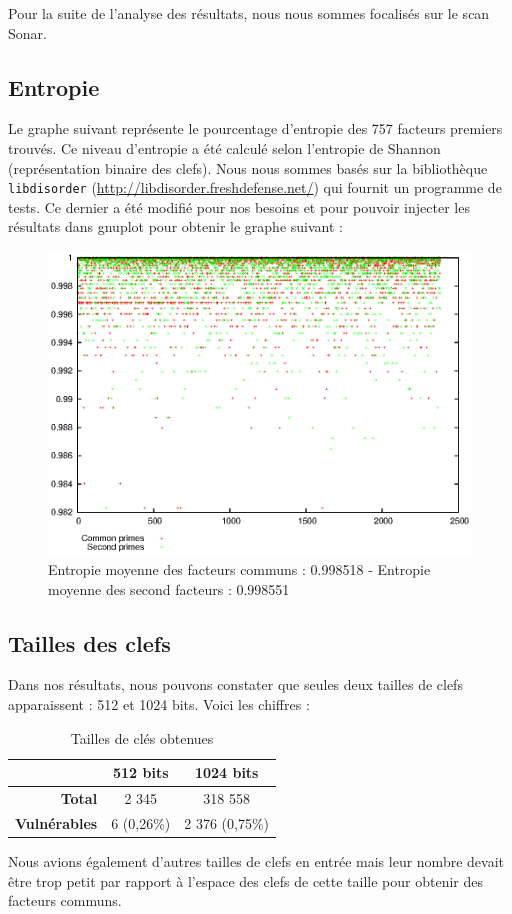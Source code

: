 Pour la suite de l'analyse des résultats, nous nous sommes focalisés sur le scan Sonar.

\subsection{Entropie}
Le graphe suivant représente le pourcentage d'entropie des 757 facteurs premiers trouvés. Ce niveau d'entropie a été calculé selon l'entropie de Shannon (représentation binaire des clefs). Nous nous sommes basés sur la bibliothèque \verb+libdisorder+ (\url{http://libdisorder.freshdefense.net/}) qui fournit un programme de tests. Ce dernier a été modifié pour nos besoins et pour pouvoir injecter les résultats dans gnuplot pour obtenir le graphe suivant :

\begin{figure}[H]
\centering
\includegraphics[width=16cm]{images/entropyprimes.eps}
\caption[Entropie moyenne]{Entropie moyenne des facteurs communs : 0.998518 - Entropie moyenne des second facteurs : 0.998551}
\label{entropiePrime}
\end{figure}


\subsection{Tailles des clefs}
Dans nos résultats, nous pouvons constater que seules deux tailles de clefs apparaissent : 512 et 1024 bits. Voici les chiffres :


\begin{table}[H]
\centering
\begin{tabular}{|r|c|c|}
\hline
\textbf{}&\textbf{512 bits}&\textbf{1024 bits}\\
\hline
\textbf{Total}&2 345&318 558\\
\hline
\textbf{Vulnérables}&6 (0,26\%)&2 376 (0,75\%)\\
\hline
\end{tabular}
\caption{Tailles de clés obtenues}
\label{tailles}
\end{table}


Nous avions également d'autres tailles de clefs en entrée mais leur nombre devait être trop petit par rapport à l'espace des clefs de cette taille pour obtenir des facteurs communs.


